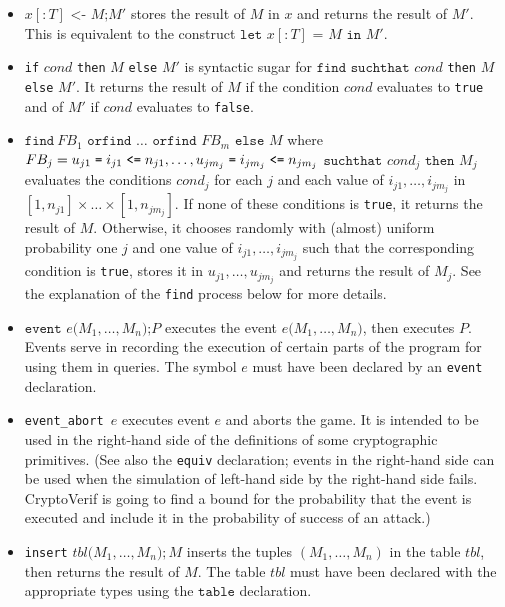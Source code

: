 \begin{itemize}
\item $x[:T] \texttt{ <- }M\texttt{;}M'$
stores the result of $M$  in $x$
and returns the result of $M'$. This is equivalent
to the construct 
$\texttt{let }x[:T] \texttt{ = }M\texttt{ in }M'$.

\item \texttt{if} $\mathit{cond}$ \texttt{then} $M$ \texttt{else} $M'$ is 
syntactic sugar for $\texttt{find suchthat }\mathit{cond}$ \texttt{then} $M$ \texttt{else} $M'$.
It returns the result of $M$ if the condition $\mathit{cond}$ evaluates to \texttt{true} and of $M'$ if $\mathit{cond}$ evaluates to \texttt{false}.

\item 
$\texttt{find}\ FB_1 \texttt{ orfind }\ldots\texttt{ orfind }FB_m \texttt{ else } M$ where $FB_j = u_{j1} \mathrel{\texttt{=}}  i_{j1} \mathrel{\texttt{<=}}  n_{j1}, \ldots, u_{jm_j} \mathrel{\texttt{=}}  i_{jm_j} \mathrel{\texttt{<=}}  n_{jm_j}$ $\texttt{suchthat}$ $cond_j$ $\texttt{then}$ $M_j$
evaluates the conditions
$cond_j$ for each $j$ and
each value of $i_{j1}, \ldots, i_{jm_j}$ in $[1, n_{j1}] 
\times \ldots \times [1, n_{jm_j}]$.
If none of these conditions is \texttt{true}, it returns the result of $M$.
Otherwise, it chooses randomly with (almost) uniform probability
one $j$ and one value of $i_{j1}, \ldots, i_{jm_j}$
such that the corresponding condition is \texttt{true},
stores it in $u_{j1}, \ldots, u_{jm_j}$ and returns 
the result of $M_j$.
See the explanation of the {\tt find} process below for more details.

\item $\texttt{event }e\texttt{(}M_1, \ldots, M_n\texttt{);}P$ executes the
event $e\texttt{(}M_1, \ldots, M_n\texttt{)}$, then executes $P$.
Events serve in recording the execution of certain parts of the program
for using them in queries. The symbol $e$ must have been declared
by an \texttt{event} declaration.

\item \texttt{event\string_abort $e$} executes event $e$ and aborts the game.
It is intended to be used in the right-hand side
of the definitions of some cryptographic primitives. (See also
the \texttt{equiv} declaration; events in the right-hand side can be
used when the simulation of left-hand side by the right-hand side
fails. CryptoVerif is going to find a bound for the probability that the event is
executed and include it in the probability of success of an attack.)

\item \texttt{insert} $\mathit{tbl}\texttt{(}M_1, \ldots, M_n\texttt{)}; M$
inserts the tuples $(M_1, \ldots, M_n)$ in the table $\mathit{tbl}$, 
then returns the result of $M$.
The table $\mathit{tbl}$ must have been declared with the appropriate
types using the $\texttt{table}$ declaration.


\end{itemize}
